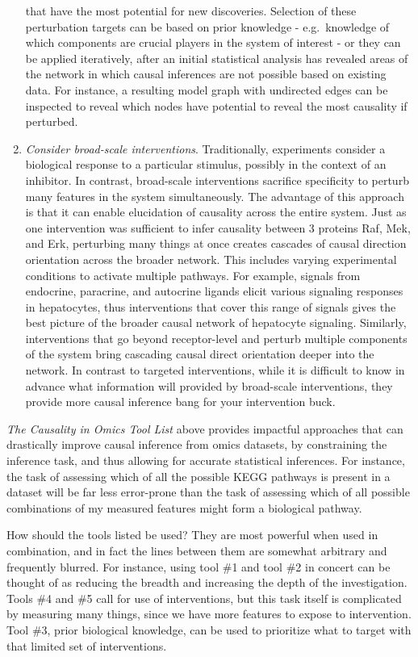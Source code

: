 \documentclass[journal=jacsat,manuscript=article]{achemso}
\begin{document}
\begin{enumerate}
that have the most potential for new discoveries. Selection of these
perturbation targets can be based on prior knowledge - e.g.~knowledge of
which components are crucial players in the system of interest - or they
can be applied iteratively, after an initial statistical analysis has
revealed areas of the network in which causal inferences are not
possible based on existing data. For instance, a resulting model graph
with undirected edges can be inspected to reveal which nodes have
potential to reveal the most causality if perturbed.
\item \textit{Consider broad-scale interventions}. Traditionally, experiments consider
a biological response to a particular stimulus, possibly in the context
of an inhibitor. In contrast, broad-scale interventions sacrifice
specificity to perturb many features in the system simultaneously. The
advantage of this approach is that it can enable elucidation of
causality across the entire system. Just as one intervention was
sufficient to infer causality between 3 proteins Raf, Mek, and Erk,
perturbing many things at once creates cascades of causal direction
orientation across the broader network. This includes varying
experimental conditions to activate multiple pathways. For example,
signals from endocrine, paracrine, and autocrine ligands elicit various
signaling responses in hepatocytes, thus interventions that cover this
range of signals gives the best picture of the broader causal network of
hepatocyte signaling. Similarly, interventions that go beyond
receptor-level and perturb multiple components of the system bring
cascading causal direct orientation deeper into the network. In contrast
to targeted interventions, while it is difficult to know in advance what
information will provided by broad-scale interventions, they provide
more causal inference bang for your intervention buck.
\end{enumerate}

\textit{The Causality in Omics Tool List} above provides impactful approaches
that can drastically improve causal inference from omics datasets, by
constraining the inference task, and thus allowing for accurate
statistical inferences. For instance, the task of assessing which of all
the possible KEGG pathways is present in a dataset will be far less
error-prone than the task of assessing which of all possible
combinations of my measured features might form a biological pathway.

How should the tools listed be used? They are most powerful when used in
combination, and in fact the lines between them are somewhat arbitrary
and frequently blurred. For instance, using tool \#1 and tool \#2 in
concert can be thought of as reducing the breadth and increasing the
depth of the investigation. Tools \#4 and \#5 call for use of
interventions, but this task itself is complicated by measuring many
things, since we have more features to expose to intervention. Tool
\#3, prior biological knowledge, can be used to prioritize what to
target with that limited set of interventions.
\end{document}
